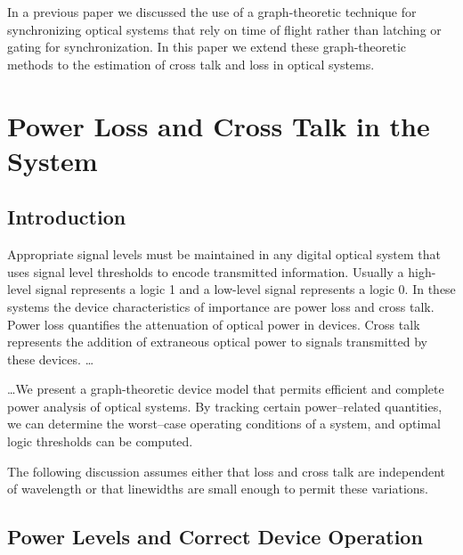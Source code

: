 In a previous paper\cite{5} we discussed the use of a graph-theoretic
technique for synchronizing optical systems that rely on time of flight
rather than latching or gating for synchronization.  In this paper we
extend these graph-theoretic methods to the estimation of cross talk and
loss in optical systems.

\section{Power Loss and Cross Talk in the System}

\subsection{ Introduction}
Appropriate signal levels must be maintained in any digital optical system
that uses signal level thresholds to encode transmitted information.
Usually a high-level signal represents a logic 1 and a low-level signal
represents a logic 0.  In these systems the device characteristics of
importance are power loss and cross talk.  Power loss quantifies the
attenuation of optical power in devices.  Cross talk represents the
addition of extraneous optical power to signals transmitted by these
devices.  \ldots

\ldots We present a graph-theoretic device model that permits efficient and
complete power analysis of optical systems.  By tracking certain
power--related quantities, we can determine the worst--case operating
conditions of a system, and optimal logic thresholds can be computed.

The following discussion assumes either that loss and cross talk are
independent of wavelength or that linewidths are small enough to permit
these variations.

\subsection{Power Levels and Correct Device Operation}

